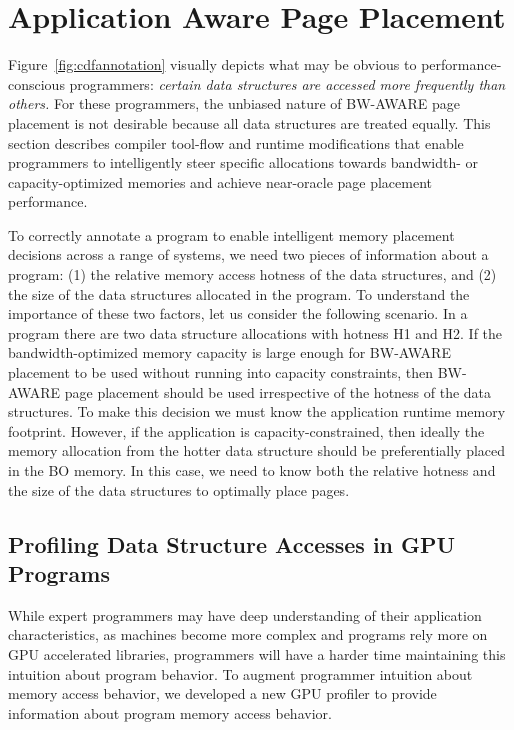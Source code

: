 \section{Application Aware Page Placement}
\label{binaryinstrument}

Figure~\ref{fig:cdfannotation} visually depicts what may be obvious to
performance-conscious programmers: \emph{certain data structures are accessed
more frequently than others.} For these programmers, the unbiased nature
of BW-AWARE page placement is not desirable because all data structures are
treated equally.  This section describes compiler tool-flow and runtime
modifications that enable programmers to intelligently steer specific allocations
towards bandwidth- or capacity-optimized memories and achieve near-oracle
page placement performance.

To correctly annotate a program to enable intelligent memory placement decisions
across a range of systems, we need two pieces of information about a program: (1)
the relative memory access hotness of the data structures, and (2) the size of
the data structures allocated in the program.  To understand the importance of
these two factors, let us consider the following scenario. In a program there
are two data structure allocations with hotness H1 and H2\@.  If the bandwidth-optimized memory
capacity is large enough for BW-AWARE placement to be used without running into
capacity constraints, then BW-AWARE page placement should be used irrespective
of the hotness of the data structures. To make this decision we must know the
application runtime memory footprint. However, if the application is
capacity-constrained, then ideally the memory allocation from the hotter data structure should be
preferentially placed in the BO memory. In this case, we need to know both the
relative hotness and the size of the data structures to optimally place pages.

\subsection{Profiling Data Structure Accesses in GPU Programs}
\label{profiler}
While expert programmers may have deep understanding of their
application characteristics, as machines become more complex and programs rely
more on GPU accelerated libraries, programmers will have a harder time
maintaining this intuition about program behavior.  To augment programmer
intuition about memory access behavior, we developed a new GPU profiler to
provide information about program memory access behavior.  

